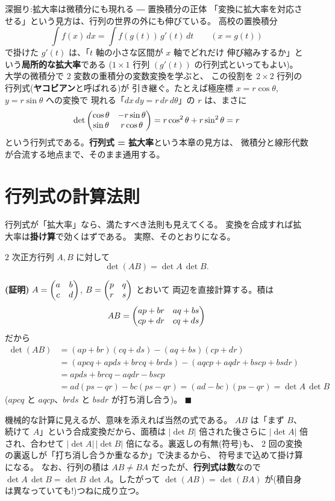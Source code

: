 \begin{itembox}[l]{深掘り:拡大率は微積分にも現れる ― 置換積分の正体}
「変換に拡大率を対応させる」という見方は、行列の世界の外にも伸びている。
高校の置換積分
\[
\int f(x)\,dx = \int f(g(t))\,g'(t)\,dt \qquad (x = g(t))
\]
で掛けた $g'(t)$ は、「$t$ 軸の小さな区間が $x$ 軸でどれだけ
伸び縮みするか」という\textbf{局所的な拡大率}である
($1 \times 1$ 行列 $(g'(t))$ の行列式といってもよい)。
大学の微積分で $2$ 変数の重積分の変数変換を学ぶと、
この役割を $2 \times 2$ 行列の行列式(\textbf{ヤコビアン}と呼ばれる)が
引き継ぐ。たとえば極座標 $x = r\cos\theta$, $y = r\sin\theta$ への変換で
現れる「$dx\,dy = r\,dr\,d\theta$」の $r$ は、まさに
\[
\det \begin{pmatrix}\cos\theta & -r\sin\theta \\ \sin\theta & r\cos\theta\end{pmatrix}
= r\cos^2\theta + r\sin^2\theta = r
\]
という行列式である。\textbf{行列式 = 拡大率}という本章の見方は、
微積分と線形代数が合流する地点まで、そのまま通用する。
\end{itembox}

\section{行列式の計算法則}

行列式が「拡大率」なら、満たすべき法則も見えてくる。
変換を合成すれば拡大率は\textbf{掛け算}で効くはずである。
実際、そのとおりになる。

\begin{teiri}[積の行列式]\label{thm:det-mult}
$2$ 次正方行列 $A, B$ に対して
\[
\det(AB) = \det A \, \det B.
\]
\end{teiri}

\noindent\textbf{(証明)}\quad
$A = \begin{pmatrix}a & b \\ c & d\end{pmatrix}$, $B = \begin{pmatrix}p & q \\ r & s\end{pmatrix}$ とおいて
両辺を直接計算する。積は
\[
AB = \begin{pmatrix}ap + br & aq + bs \\ cp + dr & cq + ds\end{pmatrix}
\]
だから
\begin{align*}
\det(AB) &= (ap + br)(cq + ds) - (aq + bs)(cp + dr) \\
&= (apcq + apds + brcq + brds) - (aqcp + aqdr + bscp + bsdr) \\
&= apds + brcq - aqdr - bscp \\
&= ad(ps - qr) - bc(ps - qr) = (ad - bc)(ps - qr) = \det A \, \det B
\end{align*}
($apcq$ と $aqcp$、$brds$ と $bsdr$ が打ち消し合う)。 $\blacksquare$

機械的な計算に見えるが、意味を添えれば当然の式である。
$AB$ は「まず $B$、続けて $A$」という合成変換だから、面積は
$|\det B|$ 倍された後さらに $|\det A|$ 倍され、合わせて
$|\det A|\,|\det B|$ 倍になる。裏返しの有無(符号)も、
$2$ 回の変換の裏返しが「打ち消し合うか重なるか」で決まるから、
符号まで込めて掛け算になる。
なお、行列の積は $AB \neq BA$ だったが、\textbf{行列式は数}なので
$\det A \, \det B = \det B \, \det A$。したがって
$\det(AB) = \det(BA)$ が(積自身は異なっていても!)つねに成り立つ。

